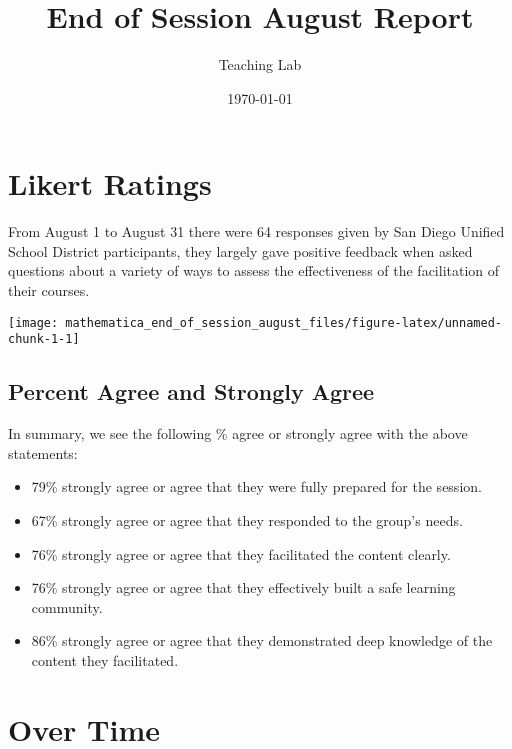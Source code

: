 \documentclass[10,a4paperpaper,]{article}
\title{End of Session August Report}
\author{Teaching Lab}
\date{\today}
\begin{document}
\renewcommand{\contentsname}{Table of Contents}

\renewcommand{\pagename}{Page}


\maketitle
\tableofcontents
{}
\clearpage

\section{Likert Ratings}

From August 1 to August 31 there were 64 responses given by San Diego
Unified School District participants, they largely gave positive
feedback when asked questions about a variety of ways to assess the
effectiveness of the facilitation of their courses.

\begin{center}\texttt{[image: mathematica\_end\_of\_session\_august\_files/figure-latex/unnamed-chunk-1-1]} \end{center}

\subsection{Percent Agree and Strongly Agree}

In summary, we see the following \% agree or strongly agree with the
above statements:

\begin{itemize}
\tightlist
\item
  79\% strongly agree or agree that they were fully prepared for the
  session.
\item
  67\% strongly agree or agree that they responded to the group's needs.
\item
  76\% strongly agree or agree that they facilitated the content
  clearly.
\item
  76\% strongly agree or agree that they effectively built a safe
  learning community.
\item
  86\% strongly agree or agree that they demonstrated deep knowledge of
  the content they facilitated.
\end{itemize}

\section{Over Time}
\end{document}

